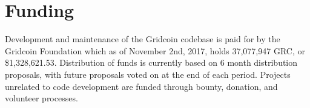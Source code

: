 \section{Funding}

\label{sec:funding}

Development and maintenance of the Gridcoin codebase is paid for by the Gridcoin Foundation which as of November 2nd, 2017, holds 37,077,947 GRC, or \$1,328,621.53.  Distribution of funds is currently based on 6 month distribution proposals, with future proposals voted on at the end of each period.  Projects unrelated to code development are funded through bounty, donation, and volunteer processes. 